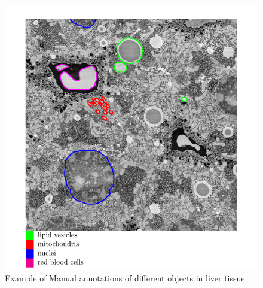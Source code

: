 \begin{figure}[h!] \label{fig:3dstack}
 \includegraphics[width=0.8\linewidth]{figures/vesicles.png}
\caption{Example of Manual annotations of different objects in liver tissue.}
\end{figure}



